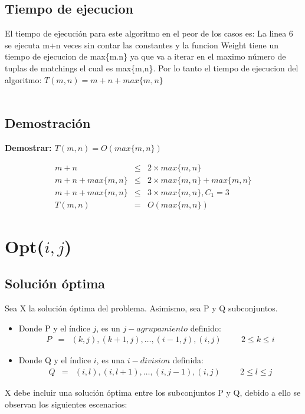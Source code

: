 \documentclass{article}
\begin{document}
\subsection{Tiempo de ejecucion}
El tiempo de ejecución para este algoritmo en el peor de los casos es: 
    La linea 6 se ejecuta m+n veces sin contar las constantes y la funcion Weight tiene un tiempo de ejecucion de max\{m.n\} ya que va a iterar en el maximo número de tuplas de matchings el cual es max\{m,n\}. 
    Por lo tanto el tiempo de ejecucion del algoritmo: $T(m,n) = m+n+max\{m,n\}$ \\ \\
\subsection{Demostración}
\textbf{Demostrar: $T(m,n) = O(max\{m,n\})$}

\begin{eqnarray*}
m+n & \leq & 2 \times max\{m,n\} \\
m+n+ max\{m,n\}  & \leq & 2 \times max\{m,n\} + max\{m,n\} \\
m+n+ max\{m,n\}  & \leq & 3 \times max\{m,n\}, C_1 = 3 \\
T(m,n)& =&  O(max\{m,n\}) 
\end{eqnarray*}
\section{Opt($i,j$)}
\subsection{Solución óptima}
Sea X la solución óptima del problema. Asimismo, sea P y Q subconjuntos.
\begin{itemize}
\item Donde P y el índice $j$, es un $j-agrupamiento$ definido:
\begin{eqnarray*}
P &=& (k,j),(k+1,j), \dots ,(i-1,j),(i,j) \hspace{1cm} 2 \leq k \leq i
\end{eqnarray*}
\item Donde Q y el índice $i$, es una $i-division$ definida:
\begin{eqnarray*}
Q &=& (i,l),(i,l+1), \dots ,(i,j-1),(i,j) \hspace{1cm} 2 \leq l \leq j
\end{eqnarray*}
\end{itemize}

X debe incluir una solución óptima entre los subconjuntos P y Q, debido a ello se observan los siguientes escenarios:
\end{document}
